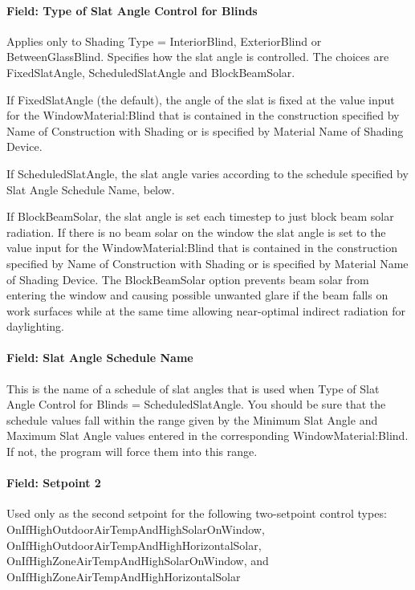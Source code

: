 \paragraph{Field: Type of Slat Angle Control for Blinds}\label{field-type-of-slat-angle-control-for-blinds}

Applies only to Shading Type = InteriorBlind, ExteriorBlind or BetweenGlassBlind. Specifies how the slat angle is controlled. The choices are FixedSlatAngle, ScheduledSlatAngle and BlockBeamSolar.

If FixedSlatAngle (the default), the angle of the slat is fixed at the value input for the WindowMaterial:Blind that is contained in the construction specified by Name of Construction with Shading or is specified by Material Name of Shading Device.

If ScheduledSlatAngle, the slat angle varies according to the schedule specified by Slat Angle Schedule Name, below.

If BlockBeamSolar, the slat angle is set each timestep to just block beam solar radiation. If there is no beam solar on the window the slat angle is set to the value input for the WindowMaterial:Blind that is contained in the construction specified by Name of Construction with Shading or is specified by Material Name of Shading Device. The BlockBeamSolar option prevents beam solar from entering the window and causing possible unwanted glare if the beam falls on work surfaces while at the same time allowing near-optimal indirect radiation for daylighting.

\paragraph{Field: Slat Angle Schedule Name}\label{field-slat-angle-schedule-name}

This is the name of a schedule of slat angles that is used when Type of Slat Angle Control for Blinds = ScheduledSlatAngle. You should be sure that the schedule values fall within the range given by the Minimum Slat Angle and Maximum Slat Angle values entered in the corresponding WindowMaterial:Blind. If not, the program will force them into this range.

\paragraph{Field: Setpoint 2}\label{field-setpoint-2}

Used only as the second setpoint for the following two-setpoint control types: OnIfHighOutdoorAirTempAndHighSolarOnWindow, OnIfHighOutdoorAirTempAndHighHorizontalSolar, OnIfHighZoneAirTempAndHighSolarOnWindow, and OnIfHighZoneAirTempAndHighHorizontalSolar

